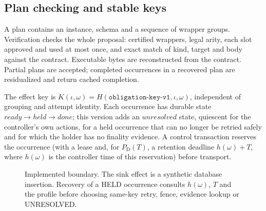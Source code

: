 \documentclass[conference,10pt]{IEEEtran}
\newcommand{\PDT}{P_{\mathrm{D}}(T)}
\newcommand{\PF}{P_{\mathrm{F}}}
\newcommand{\PO}{P_{\mathrm{O}}}
\newcommand{\Om}{\Omega}
\begin{document}
\subsection{Plan checking and stable keys}
A plan contains an instance, schema and a sequence of wrapper groups. Verification checks the whole proposal: certified wrappers, legal arity, each slot approved and used at most once, and exact match of kind, target and body against the contract. Executable bytes are reconstructed from the contract. Partial plans are accepted; completed occurrences in a recovered plan are residualized and return cached completion.

The effect key is $K(\iota,\omega)=H(\texttt{obligation-key-v1},\iota,\omega)$, independent of grouping and attempt identity. Each occurrence has durable state $\mathit{ready}\to\mathit{held}\to\mathit{done}$; this version adds an $\mathit{unresolved}$ state, quiescent for the controller's own actions, for a held occurrence that can no longer be retried safely and for which the holder has no finality evidence. A control transaction reserves the occurrence (with a lease and, for $\PDT$, a retention deadline $h(\omega)+T$, where $h(\omega)$ is the controller time of this reservation) before transport.

\begin{figure}[t]
\centering
{}
\caption{Implemented boundary. The sink effect is a synthetic database insertion. Recovery of a HELD occurrence consults $h(\omega)$, $T$ and the profile before choosing same-key retry, fence, evidence lookup or UNRESOLVED.}
\label{fig:boundary}
\end{figure}
\end{document}
